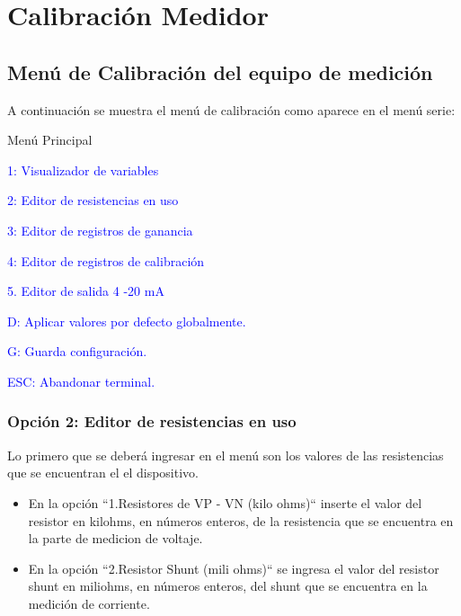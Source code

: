 

\chapter{Calibración Medidor} %

\label{AppendixB} %

\section{Menú de Calibración del equipo de medición}


A continuación se muestra el menú de calibración como aparece en el menú serie:

\textcolor{mygreen}{Menú Principal}

\textcolor{blue}{1: Visualizador de variables}

\textcolor{blue}{2: Editor de resistencias en uso}

\textcolor{blue}{3: Editor de registros de ganancia}

\textcolor{blue}{4: Editor de registros de calibración}

\textcolor{blue}{5. Editor de salida 4 -20 mA}

\textcolor{blue}{D: Aplicar valores por defecto globalmente.}

\textcolor{blue}{G: Guarda configuración.}

\textcolor{blue}{ESC: Abandonar terminal.}

\subsection{Opción 2: Editor de resistencias en uso}
Lo primero que se deberá ingresar en el menú son los valores de las resistencias que se encuentran el el dispositivo.

\begin{itemize}
\item En la opción “1.Resistores de VP - VN (kilo ohms)“ inserte el valor del resistor en kilohms, en números enteros, de la resistencia que se encuentra en la parte de medicion de voltaje.

\item En la opción “2.Resistor Shunt (mili ohms)“ se ingresa el valor del resistor shunt en miliohms, en números enteros, del shunt que se encuentra en la medición de corriente.
\end{itemize}


